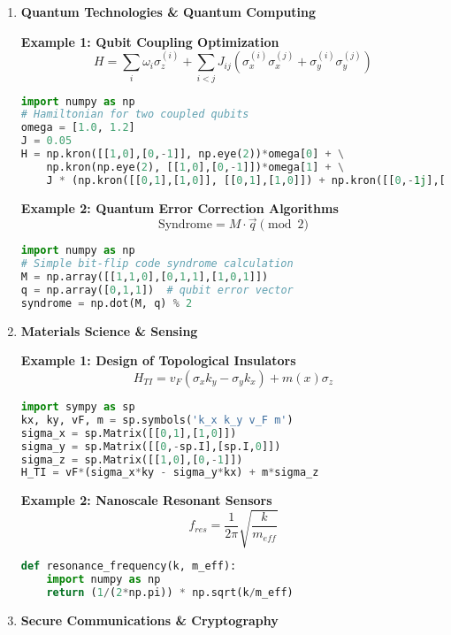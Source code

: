 \documentclass[12pt]{article}
\begin{document}
\begin{enumerate}[leftmargin=0pt, label=\textbf{\arabic*.}, itemsep=2em]

\item \textbf{Quantum Technologies \& Quantum Computing}

    \textbf{Example 1: Qubit Coupling Optimization}
    \[
    H = \sum_i \omega_i \sigma_z^{(i)} + \sum_{i<j} J_{ij} (\sigma_x^{(i)}\sigma_x^{(j)} + \sigma_y^{(i)}\sigma_y^{(j)})
    \]
    \begin{lstlisting}[language=Python]
import numpy as np
# Hamiltonian for two coupled qubits
omega = [1.0, 1.2]
J = 0.05
H = np.kron([[1,0],[0,-1]], np.eye(2))*omega[0] + \
    np.kron(np.eye(2), [[1,0],[0,-1]])*omega[1] + \
    J * (np.kron([[0,1],[1,0]], [[0,1],[1,0]]) + np.kron([[0,-1j],[1j,0]], [[0,-1j],[1j,0]]))
    \end{lstlisting}

    \textbf{Example 2: Quantum Error Correction Algorithms}
    \[
    \text{Syndrome} = M \cdot \vec{q} \pmod{2}
    \]
    \begin{lstlisting}[language=Python]
import numpy as np
# Simple bit-flip code syndrome calculation
M = np.array([[1,1,0],[0,1,1],[1,0,1]])
q = np.array([0,1,1])  # qubit error vector
syndrome = np.dot(M, q) % 2
    \end{lstlisting}

\item \textbf{Materials Science \& Sensing}

    \textbf{Example 1: Design of Topological Insulators}
    \[
    H_{TI} = v_F (\sigma_x k_y - \sigma_y k_x) + m(x) \sigma_z
    \]
    \begin{lstlisting}[language=Python]
import sympy as sp
kx, ky, vF, m = sp.symbols('k_x k_y v_F m')
sigma_x = sp.Matrix([[0,1],[1,0]])
sigma_y = sp.Matrix([[0,-sp.I],[sp.I,0]])
sigma_z = sp.Matrix([[1,0],[0,-1]])
H_TI = vF*(sigma_x*ky - sigma_y*kx) + m*sigma_z
    \end{lstlisting}

    \textbf{Example 2: Nanoscale Resonant Sensors}
    \[
    f_{res} = \frac{1}{2\pi} \sqrt{\frac{k}{m_{eff}}}
    \]
    \begin{lstlisting}[language=Python]
def resonance_frequency(k, m_eff):
    import numpy as np
    return (1/(2*np.pi)) * np.sqrt(k/m_eff)
    \end{lstlisting}

\item \textbf{Secure Communications \& Cryptography}


\end{enumerate}
\end{document}
